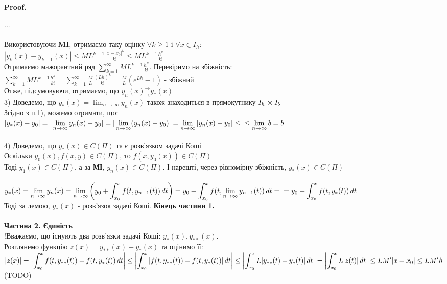 \documentclass[a4paper, 10pt]{article}
\makeatletter
\def\qed{$\blacksquare$}
\theoremstyle{theoremdd}
\theoremstyle{theoremdd}
\theoremstyle{theoremdd}
\theoremstyle{theoremdd}
\theoremstyle{theoremdd}
\theoremstyle{theoremdd}
\theoremstyle{theoremdd}
\theoremstyle{theoremdd}
\renewenvironment{proof}[1][Proof.\\]{\par
\pushQED{\hfill \qed}%
\normalfont \topsep6\p@\@plus6\p@\relax
\trivlist
\item\relax
{\bfseries
#1\@addpunct{.}}\hspace\labelsep\ignorespaces
}{%
\popQED\endtrivlist\@endpefalse
}
\makeatother
\begin{document}
\begin{proof}
	...\\
	\\
	Використовуючи \textbf{MI}, отримаємо таку оцінку $\forall k \geq 1$ і $\forall x \in I_h$:\\
	$\displaystyle |y_k(x) - y_{k-1}(x)| \leq ML^{k-1} \frac{|x-x_0|^k}{k!} \leq ML^{k-1} \frac{h^k}{k!}$\\
	Отримаємо мажорантний ряд $\displaystyle \sum_{k=1}^{\infty} ML^{k-1} \frac{h^k}{k!}$. Перевіримо на збіжність:\\
	$\displaystyle \sum_{k=1}^{\infty} ML^{k-1} \frac{h^k}{k!} = \sum_{k=1}^{\infty} \frac{M}{L} \frac{(Lh)^k}{k!} = \frac{M}{L} \left(e^{Lh}-1\right)$ - збіжний\\
	Отже, підсумовуючи, отримаємо, що $\displaystyle y_n(x)^\rightarrow_\rightarrow y_*(x)$
	\bigskip \\
	3) Доведемо, що $\displaystyle y_*(x) = \lim_{n \to \infty} y_n(x)$ також знаходиться в прямокутнику $I_h \cross I_b$\\
	Згідно з п.1), можемо отримати, що:\\
	$\displaystyle |y_*(x) - y_0| = |\lim_{n \to \infty} y_n(x) - y_0| = |\lim_{n \to \infty} (y_n(x) -y_0)| = \lim_{n \to \infty} |y_n(x)-y_0| \leq \\ \leq \lim_{n \to \infty} b = b$\\
	\bigskip \\
	4) Доведемо, що $y_*(x) \in C(\Pi)$ та є розв'язком задачі Коші\\
	Оскільки $y_0(x), f(x,y) \in C(\Pi)$, то $f(x,y_0(x)) \in C(\Pi)$\\
	Тоді $y_1(x) \in C(\Pi)$, а за \textbf{МІ}, $y_n(x) \in C(\Pi)$. І нарешті, через рівномірну збіжність, $y_*(x) \in C(\Pi)$\\
	\\
	$\displaystyle y_*(x) = \lim_{n \to \infty} y_n(x) =\lim_{n \to \infty} \left(y_0 + \int_{x_0}^x f(t,y_{n-1}(t))\,dt \right) = y_0 + \int_{x_0}^x f(t, \lim_{n \to \infty} y_{n-1}(t))\,dt = \\ = y_0 + \int_{x_0}^x f(t, y_*(t))\,dt$\\
	Тоді за лемою, $y_*(x)$ - розв'язок задачі Коші. \textbf{Кінець частини 1.}\\
	\bigskip \\
	\textbf{Частина 2. Єдиність}\\
	!Вважаємо, що існують два розв'язки задачі Коші: $y_*(x), y_{**}(x)$.\\
	Розглянемо функцію $z(x) = y_{**}(x) - y_{*}(x)$ та оцінимо її:\\
	$\displaystyle |z(x)| = \abs{\int_{x_0}^x f(t,y_{**}(t))-f(t,y_{*}(t))\,dt} \leq \abs{\int_{x_0}^x \abs{f(t,y_{**}(t))-f(t,y_{*}(t))} \,dt} \leq \abs{\int_{x_0}^x L\abs{y_{**}(t) - y_{*}(t)} \,dt} = \abs{\int_{x_0}^x L\abs{z(t)} \,dt} \leq LM'|x-x_0| \leq LM'h$
	(TODO) 
\end{proof}
	\newpage
	
\end{document}
